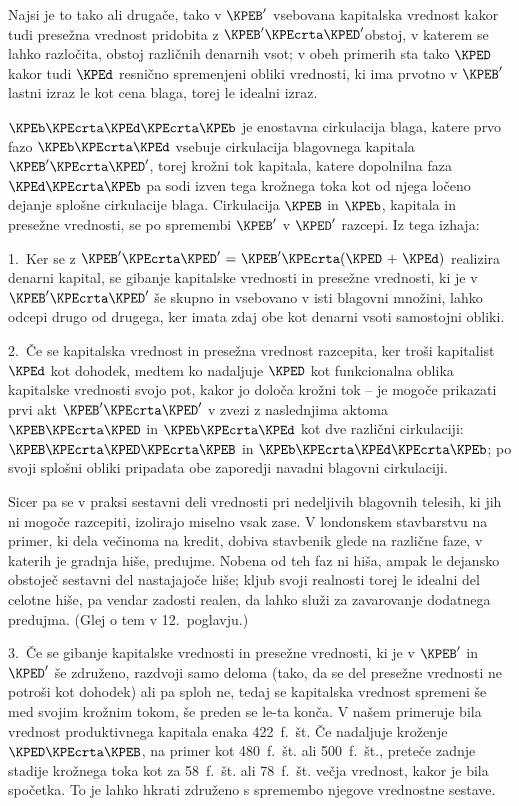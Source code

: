 \documentclass[kapital_02.tex]{subfiles}
\begin{document}
Najsi je to tako ali drugače, tako v \( \KPEB' \) vsebovana kapitalska vrednost kakor tudi presežna vrednost pridobita z \( \KPEB' \KPEcrta \KPED' \)\KPEstran obstoj, v katerem se lahko razločita, obstoj različnih denarnih vsot; v obeh primerih sta tako \( \KPED \) kakor tudi \( \KPEd \) resnično spremenjeni obliki vrednosti, ki ima prvotno v \( \KPEB' \) lastni izraz le kot cena blaga, torej le idealni izraz.

\( \KPEb \KPEcrta \KPEd \KPEcrta \KPEb \) je enostavna cirkulacija blaga, katere prvo fazo \( \KPEb \KPEcrta \KPEd \) vsebuje cirkulacija blagovnega kapitala \( \KPEB' \KPEcrta \KPED' \), torej krožni tok kapitala, katere dopolnilna faza \( \KPEd \KPEcrta \KPEb \) pa sodi izven tega krožnega toka kot od njega ločeno dejanje splošne cirkulacije blaga. Cirkulacija \( \KPEB \) in \( \KPEb \), kapitala in presežne vrednosti, se po spremembi \( \KPEB' \) v \( \KPED' \) razcepi. Iz tega izhaja:

1.\ Ker se z \( \KPEB' \KPEcrta \KPED' \textrm{ = } \KPEB' \KPEcrta ( \KPED \textrm{ + } \KPEd ) \) realizira denarni kapital, se gibanje kapitalske vrednosti in presežne vrednosti, ki je v \( \KPEB' \KPEcrta \KPED' \) še skupno in vsebovano v isti blagovni množini, lahko odcepi drugo od drugega, ker imata zdaj obe kot denarni vsoti samostojni obliki.

2.\ Če se kapitalska vrednost in presežna vrednost razcepita, ker troši kapitalist \( \KPEd \) kot dohodek, medtem ko nadaljuje \( \KPED \) kot funkcionalna oblika kapitalske vrednosti svojo pot, kakor jo določa krožni tok -- je mogoče prikazati prvi akt \( \KPEB' \KPEcrta \KPED' \) v zvezi z naslednjima aktoma \( \KPEB \KPEcrta \KPED \) in \( \KPEb \KPEcrta \KPEd \) kot dve različni cirkulaciji: \( \KPEB \KPEcrta \KPED \KPEcrta \KPEB \) in \( \KPEb \KPEcrta \KPEd \KPEcrta \KPEb \); po svoji splošni obliki pripadata obe zaporedji navadni blagovni cirkulaciji.

Sicer pa se v praksi sestavni deli vrednosti pri nedeljivih blagovnih telesih, ki jih ni mogoče razcepiti, izolirajo miselno vsak zase. V londonskem stavbarstvu na primer, ki dela večinoma na kredit, dobiva stavbenik glede na različne faze, v katerih je gradnja hiše, predujme. Nobena od teh faz ni hiša, ampak le dejansko obstoječ sestavni del nastajajoče hiše; kljub svoji realnosti torej le idealni del celotne hiše, pa vendar zadosti realen, da lahko služi za zavarovanje dodatnega predujma. (Glej o tem v 12.\ poglavju.)

3.\ Če se gibanje kapitalske vrednosti in presežne vrednosti, ki je v \( \KPEB' \) in \( \KPED' \) še združeno, razdvoji samo deloma (tako, da se del presežne vrednosti ne potroši kot dohodek) ali pa sploh ne, tedaj se kapitalska vrednost spremeni še med svojim krožnim tokom, še preden se le-ta konča. V našem primeru\KPEstran je bila vrednost produktivnega kapitala enaka 422\ f.\ št. Če nadaljuje kroženje \( \KPED \KPEcrta \KPEB \), na primer kot 480\ f.\ št. ali 500\ f.\ št., preteče zadnje stadije krožnega toka kot za 58\ f.\ št. ali 78\ f.\ št. večja vrednost, kakor je bila spočetka. To je lahko hkrati združeno s spremembo njegove vrednostne sestave.
\end{document}
